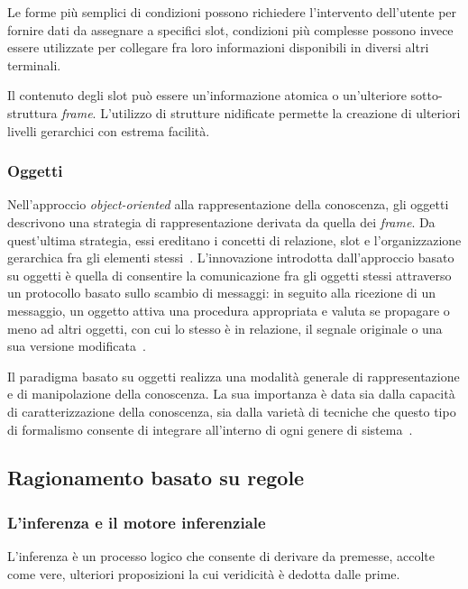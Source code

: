 Le forme più semplici di condizioni possono richiedere l'intervento dell'utente per fornire dati da assegnare a specifici slot, condizioni più complesse possono invece essere utilizzate per collegare fra loro informazioni disponibili in diversi altri terminali. 

Il contenuto degli slot può essere un'informazione atomica o un'ulteriore sotto-struttura \emph{frame}. L'utilizzo di strutture nidificate permette la creazione di ulteriori livelli gerarchici con estrema facilità.~\cite{minsky1974}

\subsubsection{Oggetti}
Nell'approccio \emph{object-oriented} alla rappresentazione della conoscenza, gli oggetti descrivono una strategia di rappresentazione derivata da quella dei \emph{frame}. Da quest'ultima strategia, essi ereditano i concetti di relazione, slot e l'organizzazione gerarchica fra gli elementi stessi~\cite{holsapple1994object}.
L'innovazione introdotta dall'approccio basato su oggetti è quella di consentire la comunicazione fra gli oggetti stessi attraverso un protocollo basato sullo scambio di messaggi: in seguito alla ricezione di un messaggio, un oggetto attiva una procedura appropriata e valuta se propagare o meno ad altri oggetti, con cui lo stesso è in relazione, il segnale originale o una sua versione modificata~\cite{development1993}.

Il paradigma basato su oggetti realizza una modalità generale di rappresentazione e di manipolazione della conoscenza. La sua importanza è data sia dalla capacità di caratterizzazione della conoscenza, sia dalla varietà di tecniche che questo tipo di formalismo consente di integrare all'interno di ogni genere di sistema~\cite{holsapple1994object}.

\subsection{Ragionamento basato su regole}

\subsubsection{L'inferenza e il motore inferenziale}

L'inferenza è un processo logico che consente di derivare da premesse, accolte come vere, ulteriori proposizioni la cui veridicità è dedotta dalle prime.

